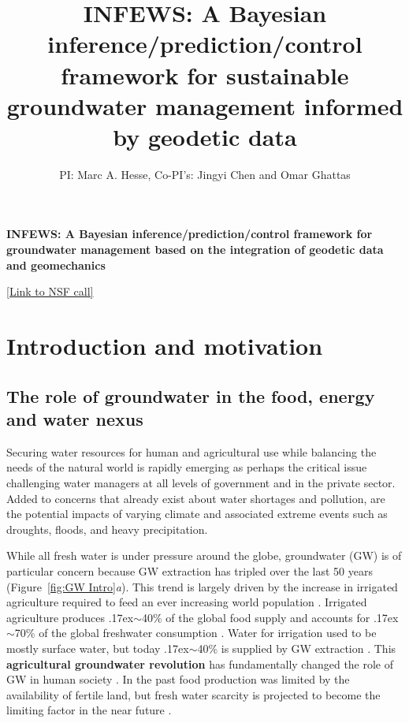 \documentclass[11pt,final]{article}%
\title{INFEWS: A Bayesian inference/prediction/control framework for sustainable groundwater management informed by geodetic data}
\author{PI: Marc A. Hesse, Co-PI's: Jingyi Chen and Omar Ghattas}
\newcommand{\mytilde}{\raise.17ex\hbox{$\scriptstyle\mathtt{\sim}$}}
\begin{document}
\maketitle


\tableofcontents
{}

\newpage




\begin{center}
{\large \bf
INFEWS: A Bayesian inference/prediction/control framework for groundwater management based on the integration of geodetic data and geomechanics}
\end{center}

\href{https://www.nsf.gov/funding/pgm_summ.jsp?pims_id=505241}{[Link to NSF call]}

\section{Introduction and motivation}

\subsection{The role of groundwater in the food, energy and water nexus}
Securing water resources for human and agricultural use while balancing the needs of the natural world is rapidly emerging as perhaps the critical issue challenging water managers at all levels of government and in the private sector. Added to concerns that already exist about water shortages and pollution, are the potential impacts of varying climate and associated extreme events such as droughts, floods, and heavy precipitation. 


While all fresh water is under pressure around the globe, groundwater (GW) is of particular concern because GW extraction has tripled over the last 50 years (Figure~\ref{fig:GW Intro}\emph{a}). 
This trend is largely driven by the increase in irrigated agriculture required to feed an ever increasing world population \cite{Wada2010,Hoekstra2012}. Irrigated agriculture produces \mytilde 40\% of the global food supply and accounts for \mytilde70\% of the global freshwater consumption \cite{Siebert2010,Kummu2014}. Water for irrigation used to be mostly surface water, but today \mytilde 40\% is supplied by GW extraction \cite{Rost2008,Vorosmarty2000}. This \textbf{agricultural groundwater revolution} has fundamentally changed the role of GW in human society \cite{UNESCO2012}. In the past food production was limited by the availability of fertile land, but fresh water scarcity is projected to become the limiting factor in the near future \cite{Watkins2006,Sauer2010,Hanjra2010}. 
\end{document}
